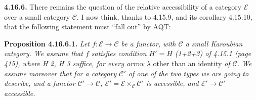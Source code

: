 \textbf{4.16.6.} There remains the question of the relative accessibility of a category $\mathcal{E}$ over a small category $\mathcal{C}$. I now think, thanks to 4.15.9, and its corollary 4.15.10, that the following statement must ``fall out'' by AQT:

\textbf{Proposition 4.16.6.1.} \textit{Let $f : \mathcal{E} \longrightarrow \mathcal{C}$ be a functor, with $\mathcal{C}$ a small Karoubian category. We assume that $f$ satisfies condition $H' = H$ (1+2+3) of 4.15.1 (page 415), where H 2, H 3 suffice, for every arrow $\lambda$} other than an identity \textit{of $\mathcal{C}$. We assume moreover that for a category $\mathcal{C}'$ of one of the two types we are going to describe, and a functor $\mathcal{C}' \longrightarrow \mathcal{C}$, $\mathcal{E}' = \mathcal{E} \times_{\mathcal{C}} \mathcal{C}'$ is accessible, and $\mathcal{E}' \longrightarrow \mathcal{C}'$ accessible.}


